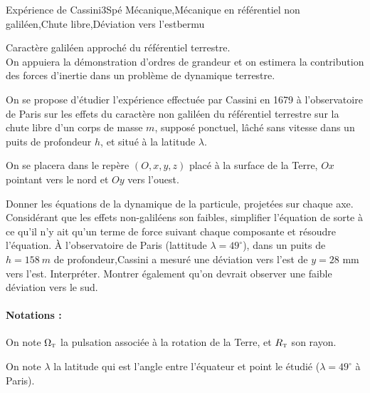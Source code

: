 
\begin{exercise}{Expérience de Cassini}{3}{Spé}
{Mécanique,Mécanique en référentiel non galiléen,Chute libre,Déviation vers l'est}{bermu}

\begin{questions}
    \questioncours Caractère galiléen approché du référentiel terrestre. \\
    On appuiera la démonstration d'ordres de grandeur et on estimera la contribution des forces d'inertie dans un problème de dynamique terrestre.
    

\begin{EnvUplevel}
On se propose d'étudier l'expérience effectuée par Cassini en 1679 à l'observatoire de Paris sur les effets du caractère non galiléen du référentiel terrestre sur la chute libre d'un corps de masse $m$, supposé ponctuel, lâché sans vitesse dans un puits de profondeur $h$, et situé à la latitude $\lambda$.

On se placera dans le repère $(O,x,y,z)$ placé à la surface de la Terre, $Ox$ pointant vers le nord et $Oy$ vers l'ouest.

\end{EnvUplevel}
    \question Donner les équations de la dynamique de la particule, projetées sur chaque axe.
    \question Considérant que les effets non-galiléens son faibles, simplifier l'équation de sorte à ce qu'il n'y ait qu'un terme de force suivant chaque composante et résoudre l'équation.
    \question \`A l'observatoire de Paris (lattitude $\lambda = 49^\circ$), dans un puits de $h = \SI{158}{m}$ de profondeur,\linebreak Cassini a mesuré une déviation vers l'est de $y = 28$ mm vers l'est. Interpréter.
    \questionbonus Montrer également qu'on devrait observer une faible déviation vers le sud.
\end{questions}
\paragraph{Notations :} 
On note $\Omega_\textsc{t}$ la pulsation associée à la rotation de la Terre, et $R_\textsc{t}$ son rayon.

\hspace{4.3em}
On note $\lambda$ la latitude qui est l'angle entre l'équateur et point le étudié ($\lambda = 49^\circ$ à Paris).\end{exercise}

